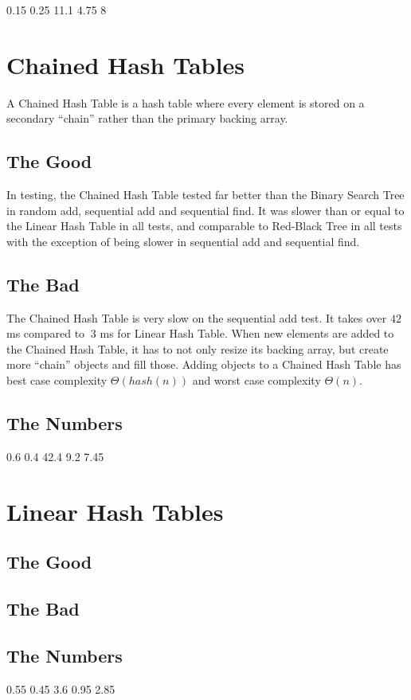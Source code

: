 \documentclass{muformallab}
\begin{document}
   {0.15} {0.25} {11.1} {4.75} {8}

  \section{Chained Hash Tables}

  A Chained Hash Table is a hash table where every element is stored on
  a secondary ``chain'' rather than the primary backing array.

  \subsection{The Good}

  In testing, the Chained Hash Table tested far better than the Binary
  Search Tree in random add, sequential add and sequential find. It was
  slower than or equal to the Linear Hash Table in all tests, and
  comparable to Red-Black Tree in all tests with the exception of being
  slower in sequential add and sequential find.

  \subsection{The Bad}

  The Chained Hash Table is very slow on the sequential add test. It takes
  over $42$ ms compared to $~3$ ms for Linear Hash Table. When new
  elements are added to the Chained Hash Table, it has to not only resize
  its backing array, but create more ``chain'' objects and fill those.
  Adding objects to a Chained Hash Table has best case complexity $\Theta
  \left( hash \left( n \right) \right)$ and worst case complexity $\Theta
  \left( n \right)$.

  \subsection{The Numbers}

   {0.6} {0.4} {42.4} {9.2} {7.45}

  \section{Linear Hash Tables}

  \subsection{The Good}

  \subsection{The Bad}

  \subsection{The Numbers}

   {0.55} {0.45} {3.6} {0.95} {2.85}
\end{document}
